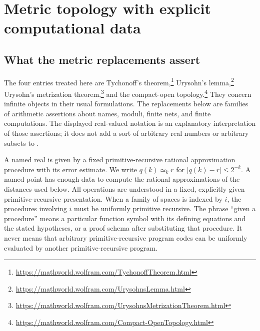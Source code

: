 \section{Metric topology with explicit computational data}
\label{sec:metric}

\subsection{What the metric replacements assert}

The four entries treated here are Tychonoff's theorem,\footnote{\url{https://mathworld.wolfram.com/TychonoffTheorem.html}}
Urysohn's lemma,\footnote{\url{https://mathworld.wolfram.com/UrysohnsLemma.html}}
Urysohn's metrization theorem,\footnote{\url{https://mathworld.wolfram.com/UrysohnsMetrizationTheorem.html}}
and the compact-open topology.\footnote{\url{https://mathworld.wolfram.com/Compact-OpenTopology.html}}  They concern
infinite objects in their usual formulations.  The replacements below are
families of arithmetic assertions about names, moduli, finite nets, and
finite computations.  The displayed real-valued notation is an explanatory
interpretation of those assertions; it does not add a sort of arbitrary
real numbers or arbitrary subsets to \ipra.

A named real is given by a fixed primitive-recursive rational approximation
procedure with its error estimate.  We write $q(k)\simeq_k r$ for
$|q(k)-r|\leq 2^{-k}$.  A named point has enough data to compute the
rational approximations of the distances used below.  All operations are
understood in a fixed, explicitly given primitive-recursive presentation.
When a family of spaces is indexed by $i$, the procedures involving $i$
must be uniformly primitive recursive.  The phrase ``given a procedure''
means a particular function symbol with its defining equations and the
stated hypotheses, or a proof schema after substituting that procedure.
It never means that arbitrary primitive-recursive program codes can be
uniformly evaluated by another primitive-recursive program.

